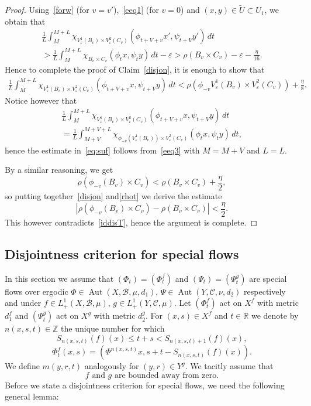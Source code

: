 \documentclass[10pt]{amsart}
\let\mathcal\mathscr
\let\epsilon\varepsilon
\DeclareMathOperator{\Aut}{Aut}
\theoremstyle{definition}
\theoremstyle{plain}
\newcommand\RR{\mathbb{R}}
\newcommand\ZZ{\mathbb{Z}}
\newcommand\cB{\mathcal{B}}
\newcommand\cC{\mathcal{C}}
\newcommand{\be}{\begin{equation*}}
\newcommand{\ee}{\end{equation*}}
\begin{document}
\begin{proof}
Using~\eqref{forw} (for $v=v'$),~\eqref{eeq1} (for $v=0$) and $(x,y)\in \widetilde{U}\subset U_1$, we obtain that
\begin{multline*}
\frac{1}{L}\int_{M}^{M+L}\chi_{V^1_{\epsilon}(B_v)
\times V^2_{\epsilon}(C_v)}(\phi_{t+V+v}x',\psi_{t+V}y')\,dt \\ > \frac{1}{L}\int_{M}^{M+L}\chi_{B_v
\times C_v}(\phi_tx,\psi_ty)\,dt-\epsilon >
\rho(B_v\times C_v)-\epsilon-\frac{\eta}{16}.
\end{multline*}
Hence to complete the proof of Claim~\eqref{disjon}, it is enough to show that
\begin{multline}\label{eq:suf}
\frac{1}{L}\int_{M}^{M+L}\chi_{V^1_{\epsilon}(B_v)
\times
V^2_\epsilon(C_v)}(\phi_{t+V+v}x,\psi_{t+V}y)\,dt<
\rho(\phi_{-v}V^1_{\epsilon}(B_v)
\times V^2_\epsilon(C_v))+\frac{\eta}{8}.
\end{multline}
Notice however that
\begin{multline*}
\frac{1}{L}\int_{M}^{M+L}\chi_{V^1_{\epsilon}(B_v)
\times
V^2_\epsilon(C_v)}(\phi_{t+V+v}x,\psi_{t+V}y)\,dt \\ =\frac{1}{L}\int_{M+V}^{M+V+L}\chi_{\phi_{-v}(V^1_{\epsilon}(B_v))
\times
V^2_\epsilon(C_v)}(\phi_{t}x,\psi_{t}y)\,dt,
\end{multline*}
hence the estimate in~\eqref{eq:suf} follows from~\eqref{eeq3} with $M=M+V$ and $L=L$.

By a similar reasoning, we get
\begin{equation}\label{rhot}\rho(\phi_{-v}(B_v)\times C_v)<\rho(B_v\times C_v)+\frac{\eta}{2},
\end{equation}
so putting together~\eqref{disjon} and\eqref{rhot} we derive the estimate
\[|\rho(\phi_{-v}(B_v)\times C_v)-\rho(B_v\times C_v)|<\frac{\eta}{2}.\]
This however contradicts~\eqref{iddisT}, hence the argument is complete.
\end{proof}

\subsection{Disjointness criterion for special flows}
In this section we assume that $(\Phi_t)=(\Phi_t^f)$ and $(\Psi_t)=(\Psi_t^g)$ are special flows over ergodic $\Phi\in \Aut(X,\cB,\mu,d_1)$, $\Psi\in \Aut(Y,\cC,\nu,d_2)$ respectively and under $f\in L^1_+(X,\cB,\mu)$, $g\in L^1_+(Y,\cC,\mu)$. Let $(\Phi_t^f)$ act on $X^f$ with metric $d_1^f$ and $(\Psi_t^g)$ act on $X^g$ with metric $d_2^g$. For $(x,s)\in X^f$ and $t\in \RR$ we denote by $n(x,s,t)\in \ZZ$ the unique number for which
\[
S_{n(x,s,t)}(f)(x)\leq t+s<S_{n(x,s,t)+1}(f)(x),
\]
\ie
\be\label{do1}
\Phi^f_{t}(x,s)=(\Phi^{n(x,s,t)}x,s+t-S_{n(x,s,t)}(f)(x)).\ee
We define $m(y,r,t)$ analogously for $(y,r)\in Y^g$.
We tacitly assume that
\be\label{do2}
\mbox{$f$ and $g$ are bounded away from zero.}
\ee
Before we state a disjointness criterion for special flows, we need the following general lemma:
\end{document}
